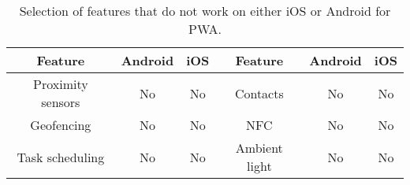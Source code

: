 \begin{table}[ht]
    \centering
    \begin{tabular}{ |c|c|c|c|c|c| } 
        \hline
        \rowcolor{light-gray}
        Feature & Android & iOS & Feature & Android & iOS\\
        \hline
        Proximity sensors & No & No & Contacts & No & No \\ 
        \hline
        Geofencing & No & No & NFC & No & No \\ 
        \hline
        Task scheduling & No & No & Ambient light & No & No \\ 
        \hline
    \end{tabular}
    \caption{\label{tab:no-feature}Selection of features that do not work on either iOS or Android for PWA.}
\end{table}